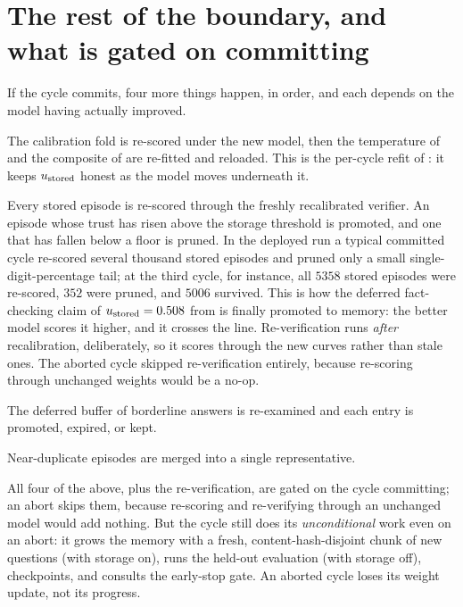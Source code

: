 \section{The rest of the boundary, and what is gated on committing}
\label{sec:cycle-boundary-ops}

If the cycle commits, four more things happen, in order, and each depends on the model
having actually improved.

\begin{description}[leftmargin=0pt, labelsep=0.5em, style=nextline]
  \item[Recalibrate.] The calibration fold is re-scored under the new model, then the
  temperature of  and the composite of  are re-fitted
  and reloaded. This is the per-cycle refit of : it keeps
  $u_{\text{stored}}$ honest as the model moves underneath it.
  \item[Re-verify the memory.] Every stored episode is re-scored through the freshly
  recalibrated verifier. An episode whose trust has risen above the storage threshold is
  promoted, and one that has fallen below a floor is pruned. In the deployed run a typical
  committed cycle re-scored several thousand stored episodes and pruned only a small
  single-digit-percentage tail; at the third cycle, for instance, all $5358$ stored
  episodes were re-scored, $352$ were pruned, and $5006$ survived. This is how the deferred
  fact-checking claim of $u_{\text{stored}} = 0.508$ from  is finally promoted to
  memory: the better model scores it higher, and it crosses the line. Re-verification runs
  \emph{after} recalibration, deliberately, so it scores through the new curves rather
  than stale ones. The aborted cycle skipped re-verification entirely, because re-scoring
  through unchanged weights would be a no-op.
  \item[Reconsider deferrals.] The deferred buffer of borderline answers is re-examined
  and each entry is promoted, expired, or kept.
  \item[Consolidate.] Near-duplicate episodes are merged into a single representative.
\end{description}

\begin{pitfall}
All four of the above, plus the re-verification, are gated on the cycle committing; an
abort skips them, because re-scoring and re-verifying through an unchanged model would add
nothing. But the cycle still does its \emph{unconditional} work even on an abort: it grows
the memory with a fresh, content-hash-disjoint chunk of new questions (with storage on),
runs the held-out evaluation (with storage off), checkpoints, and consults the early-stop
gate. An aborted cycle loses its weight update, not its progress.
\end{pitfall}

